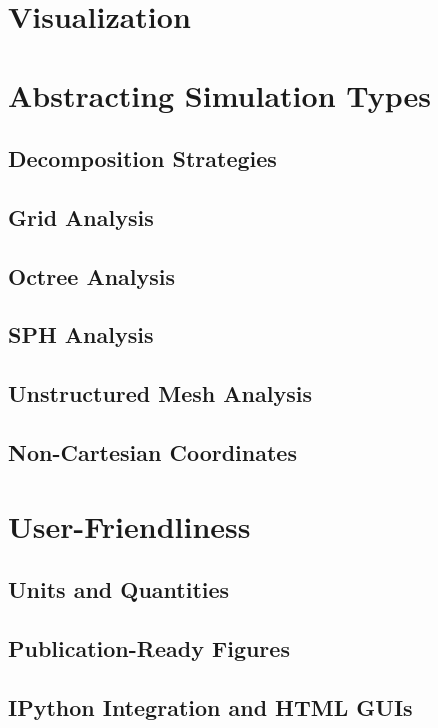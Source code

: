 \documentclass{emulateapj}
\begin{document}
\section{Visualization}

\section{Abstracting Simulation Types}

\subsection{Decomposition Strategies}

\subsection{Grid Analysis}

\subsection{Octree Analysis}

\subsection{SPH Analysis}

\subsection{Unstructured Mesh Analysis}

\subsection{Non-Cartesian Coordinates}

\section{User-Friendliness}

\subsection{Units and Quantities}

\subsection{Publication-Ready Figures}

\subsection{IPython Integration and HTML GUIs}
\end{document}
